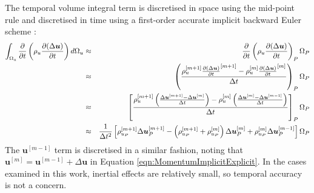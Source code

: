 \documentclass[sn-mathphys,Numbered]{sn-jnl}%
\newcommand{\bb}{\boldsymbol}
\begin{document}
 The temporal volume integral term is discretised in space using the mid-point rule and discretised in time using a first-order accurate implicit backward Euler scheme \cite{jasak_application_2000}:
\begin{eqnarray} \label{eq:timeTerm}
	\int_{\mathrm{\Omega_u}} \frac{\partial }{\partial t} \left( \rho_u \frac{\partial (\Delta \bb{u}) }{\partial t} \right) d\mathrm{\Omega}_u
	&\approx&
	\frac{\partial }{\partial t} \left( \rho_u \frac{\partial (\Delta \bb{u}) }{\partial t} \right)_P \mathrm{\Omega}_P \notag \\
	&\approx&
	\left(
	\frac{ \rho_u^{[m+1]} \frac{\partial (\Delta \bb{u}) }{\partial t}^{[m+1]}
	- \rho_u^{[m]} \frac{\partial (\Delta \bb{u}) }{\partial t}^{[m]}}{ \Delta t } \right)_P
	\mathrm{\Omega}_P \notag \\
	&\approx&
	\left[
	\frac{ \rho_u^{[m+1]} \left(\frac{\Delta \bb{u}^{[m+1]} - \Delta \bb{u}^{[m]}}{\Delta t} \right)
	- \rho_u^{[m]} \left(\frac{\Delta \bb{u}^{[m]} - \Delta \bb{u}^{[m-1]}}{\Delta t} \right)
	}{ \Delta t } 
	\right]_P \mathrm{\Omega}_P \notag \\
	&\approx&
	\frac{1}{\Delta t^2} \left[
	 \rho_{u_P}^{[m+1]} \Delta \bb{u}^{[m+1]}_P
	- \left(\rho_{u_P}^{[m+1]} + \rho_{u_P}^{[m]} \right)  \Delta \bb{u}^{[m]}_P
	+ \rho_{u_P}^{[m]}  \Delta \bb{u}^{[m-1]}_P
	\right]
	 \mathrm{\Omega}_P \notag \\
\end{eqnarray}
The $\boldsymbol{u}^{[m-1]}$ term is discretised in a similar fashion, noting that $\boldsymbol{u}^{[m]} = \boldsymbol{u}^{[m-1]} + \Delta \boldsymbol{u}$ in Equation \ref{eqn:MomentumImplicitExplicit}.
In the cases examined in this work, inertial effects are relatively small, so temporal accuracy is not a concern.
\end{document}
